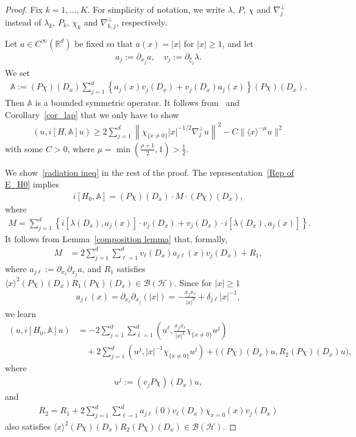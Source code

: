\documentclass[AHL,Unicode,longabstracts,published]{cedram}
\renewcommand{\d}{\delta}
\renewcommand{\l}{\lambda}
\newcommand{\x}{\xi}
\newcommand{\R}{\mathbb{R}}
\newcommand{\bbA}{\mathbb{A}}
\newcommand{\HS}{\mathcal{H}}
\newcommand{\BS}{\mathcal{B}}
\newcommand{\jap}[1]{\langle #1 \rangle}
\newcommand{\R}{\mathbb{R}}
\newcommand{\HS}{\mathcal{H}}
\begin{document}
\begin{proof}
Fix $k=1,\dots,K$. For simplicity of notation, we write $\l$, $P$, $\chi$ and $\nabla_j^\perp$ instead of $\l_k$, $P_k$, $\chi_k$ and $\nabla_{k,j}^\perp$, respectively.

Let $a\in C^\infty(\R^d)$ be fixed so that $a(x)=|x|$ for $|x|\geq1$, and let
\begin{align*}
a_j:=\partial_{x_j}a, \quad v_j:=\partial_{\x_j}\l.
\end{align*}
We set
\begin{align*}
\bbA := (P\chi)(D_x) \sum_{j=1}^d \left\{a_j(x)v_j(D_x)+v_j(D_x)a_j(x) \right\} (P\chi)(D_x).
\end{align*}
Then $\bbA$ is a bounded symmetric operator. It follows from~\cite[Proposition~0.5.11]{Y} and Corollary~\ref{cor_lap} that we only have to show
\begin{align}\label{radiation ineq}
\left(u, i[H,\bbA]u\right)
\geq 2\sum_{j=1}^d \left\| \chi_{\{x\neq0\}}|x|^{-1/2} \nabla_{j}^\perp u \right\|^2 -C\|\jap{x}^{-\mu}u\|^2
\end{align}
with some $C>0$, where $\mu=\min(\frac{\rho+1}{2},1)>\frac12$.

We show~\eqref{radiation ineq} in the rest of the proof. The representation~\eqref{Rep of E_H0} implies
\begin{align*}
i[H_0,\bbA] = (P\chi)(D_x) \cdot M \cdot (P\chi)(D_x),
\end{align*}
where
\begin{align*}
M = \sum_{j=1}^d \left\{i\left[\l(D_x),a_j(x)\right] \cdot v_j(D_x) + v_j(D_x) \cdot i\left[\l(D_x),a_j(x)\right] \right\}.
\end{align*}
It follows from Lemma~\ref{composition lemma} that, formally,
\begin{align*}
M &= 2 \sum_{j=1}^d \sum_{\ell=1}^d v_\ell(D_x)a_{j\ell}(x) v_j(D_x) + R_1,
\end{align*}
where $a_{j\ell}:=\partial_{x_\ell}\partial_{x_j}a$, and $R_1$ satisfies $\jap{x}^2 (P\chi)(D_x) R_1 (P\chi)(D_x) \in \BS(\HS)$. Since for $|x|\geq1$
\begin{align*}
a_{j\ell}(x) = \partial_{x_\ell}\partial_{x_j}\left(|x|\right) = -\frac{x_j x_\ell}{|x|^3} + \d_{j\ell} |x|^{-1},
\end{align*}
we learn
\begin{equation}\label{radiation pf commutator}
\begin{split}
(u,i[H_0,\bbA]u) 
&= -2 \sum_{j=1}^d \sum_{\ell=1}^d \left(u^\ell, \frac{x_j x_\ell}{|x|^3} \chi_{\{x\neq0\}} u^j\right) \\
&\quad+2 \sum_{j=1}^d \left(u^j, |x|^{-1}\chi_{\{x\neq0\}}u^j\right)
 + \bigl((P\chi)(D_x)u, R_2 (P\chi)(D_x)u\bigr), 
\end{split}
\end{equation}
where
\begin{align*}
u^j:= (v_j P\chi)(D_x) u,
\end{align*}
and
\begin{align*}
R_2= R_1 + 2 \sum_{j=1}^d \sum_{\ell=1}^d a_{j\ell}(0) v_\ell(D_x) \chi_{x=0}(x) v_j(D_x)
\end{align*}
also satisfies $\jap{x}^2 (P\chi)(D_x) R_2 (P\chi)(D_x) \in \BS(\HS)$.


\end{proof}
\end{document}

